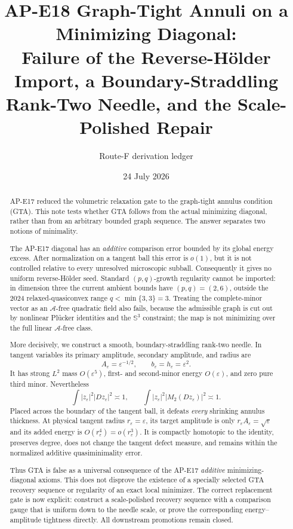 \documentclass[10pt]{article}
\title{AP-E18 Graph-Tight Annuli on a Minimizing Diagonal:\\
Failure of the Reverse-H\"older Import, a Boundary-Straddling\\
Rank-Two Needle, and the Scale-Polished Repair}
\author{Route-F derivation ledger}
\date{24 July 2026}
\newcommand{\SSS}{\mathbb S}
\begin{document}
\maketitle

\begin{abstract}
AP-E17 reduced the volumetric relaxation gate to the graph-tight annulus
condition (GTA).  This note tests whether GTA follows from the actual
minimizing diagonal, rather than from an arbitrary bounded graph sequence.
The answer separates two notions of minimality.

The AP-E17 diagonal has an \emph{additive} comparison error bounded by its
global energy excess.  After normalization on a tangent ball this error is
$o(1)$, but it is not controlled relative to every unresolved microscopic
subball.  Consequently it gives no uniform reverse-H\"older seed.  Standard
$(p,q)$-growth regularity cannot be imported: in dimension three the current
ambient bounds have $(p,q)=(2,6)$, outside the 2024 relaxed-quasiconvex range
$q<\min\{3,3\}=3$.  Treating the complete-minor vector as an
$\mathscr A$-free quadratic field also fails, because the admissible graph is
cut out by nonlinear Pl\"ucker identities and the $\SSS^3$ constraint; the
map is not minimizing over the full linear $\mathscr A$-free class.

More decisively, we construct a smooth, boundary-straddling rank-two needle.
In tangent variables its primary amplitude, secondary amplitude, and radius
are
\[
 A_\varepsilon=\varepsilon^{-1/2},\qquad
 b_\varepsilon=h_\varepsilon=\varepsilon^2 .
\]
It has strong $L^2$ mass $O(\varepsilon^5)$, first- and second-minor energy
$O(\varepsilon)$, and zero pure third minor.  Nevertheless
\[
 \int |z_\varepsilon|^2|Dz_\varepsilon|^2\asymp1,\qquad
 \int |z_\varepsilon|^2|M_2(Dz_\varepsilon)|^2\asymp1 .
\]
Placed across the boundary of the tangent ball, it defeats \emph{every}
shrinking annulus thickness.  At physical tangent radius
$r_\varepsilon=\varepsilon$, its target amplitude is only
$r_\varepsilon A_\varepsilon=\sqrt\varepsilon$ and its added energy is
$O(r_\varepsilon^4)=o(r_\varepsilon^3)$.  It is compactly homotopic to the
identity, preserves degree, does not change the tangent defect measure, and
remains within the normalized additive quasiminimality error.

Thus GTA is false as a universal consequence of the AP-E17
\emph{additive} minimizing-diagonal axioms.  This does not disprove the
existence of a specially selected GTA recovery sequence or regularity of an
exact local minimizer.  The correct replacement gate is now explicit:
construct a scale-polished recovery sequence with a comparison gauge that is
uniform down to the needle scale, or prove the corresponding
energy--amplitude tightness directly.  All downstream promotions remain
closed.
\end{abstract}
\end{document}
